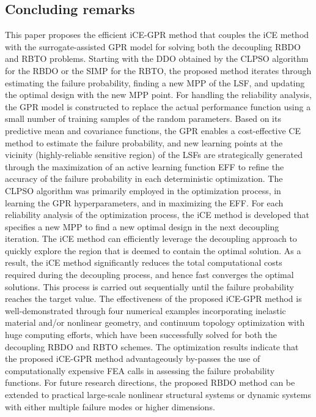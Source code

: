 \documentclass[preprint,3p]{elsarticle}
\begin{document}
\begin{linenumbers}
\section{Concluding remarks}
\label{sec5}
This paper proposes the efficient iCE-GPR method that couples the iCE method with the surrogate-assisted GPR model for solving both the decoupling RBDO and RBTO problems. Starting with the DDO obtained by the CLPSO algorithm for the RBDO or the SIMP for the RBTO, the proposed method iterates through estimating the failure probability, finding a new MPP of the LSF, and updating the optimal design with the new MPP point. For handling the reliability analysis, the GPR model is constructed to replace the actual performance function using a small number of training samples of the random parameters. Based on its predictive mean and covariance functions, the GPR enables a cost-effective CE method to estimate the failure probability, and new learning points at the vicinity (highly-reliable sensitive region) of the LSFs are strategically generated through the maximization of an active learning function EFF to refine the accuracy of the failure probability in each deterministic optimization. The CLPSO algorithm was primarily employed in the optimization process, in learning the GPR hyperparameters, and in maximizing the EFF. For each reliability analysis of the optimization process, the iCE method is developed that specifies a new MPP to find a new optimal design in the next decoupling iteration. The iCE method can efficiently leverage the decoupling approach to quickly explore the region that is deemed to contain the optimal solution. As a result, the iCE method significantly reduces the total computational costs required during the decoupling process, and hence fast converges the optimal solutions. This process is carried out sequentially until the failure probability reaches the target value. The effectiveness of the proposed iCE-GPR method is well-demonstrated through four numerical examples incorporating inelastic material and/or nonlinear geometry, and continuum topology optimization with huge computing efforts, which have been successfully solved for both the decoupling RBDO and RBTO schemes. The optimization results indicate that the proposed iCE-GPR method advantageously by-passes the use of computationally expensive FEA calls in assessing the failure probability functions. For future research directions, the proposed RBDO method can be extended to practical large-scale nonlinear structural systems or dynamic systems with either multiple failure modes or higher dimensions.


\end{linenumbers}
\end{document}
